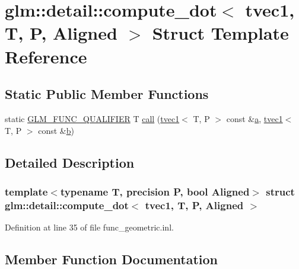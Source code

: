 \hypertarget{structglm_1_1detail_1_1compute__dot_3_01tvec1_00_01_t_00_01_p_00_01_aligned_01_4}{}\section{glm\+::detail\+::compute\+\_\+dot$<$ tvec1, T, P, Aligned $>$ Struct Template Reference}
\label{structglm_1_1detail_1_1compute__dot_3_01tvec1_00_01_t_00_01_p_00_01_aligned_01_4}
\subsection*{Static Public Member Functions}
\begin{DoxyCompactItemize}
\item 
static \mbox{\hyperlink{setup_8hpp_a33fdea6f91c5f834105f7415e2a64407}{G\+L\+M\+\_\+\+F\+U\+N\+C\+\_\+\+Q\+U\+A\+L\+I\+F\+I\+ER}} T \mbox{\hyperlink{structglm_1_1detail_1_1compute__dot_3_01tvec1_00_01_t_00_01_p_00_01_aligned_01_4_aaee5dcefecbec5a8bdec58b7b0f7deaf}{call}} (\mbox{\hyperlink{structglm_1_1tvec1}{tvec1}}$<$ T, P $>$ const \&\mbox{\hyperlink{glad_8h_ac8729153468b5dcf13f971b21d84d4e5}{a}}, \mbox{\hyperlink{structglm_1_1tvec1}{tvec1}}$<$ T, P $>$ const \&\mbox{\hyperlink{glad_8h_a6eba317e3cf44d6d26c04a5a8f197dcb}{b}})
\end{DoxyCompactItemize}


\subsection{Detailed Description}
\subsubsection*{template$<$typename T, precision P, bool Aligned$>$\newline
struct glm\+::detail\+::compute\+\_\+dot$<$ tvec1, T, P, Aligned $>$}



Definition at line 35 of file func\+\_\+geometric.\+inl.



\subsection{Member Function Documentation}
\mbox{\label{structglm_1_1detail_1_1compute__dot_3_01tvec1_00_01_t_00_01_p_00_01_aligned_01_4_aaee5dcefecbec5a8bdec58b7b0f7deaf}} 
